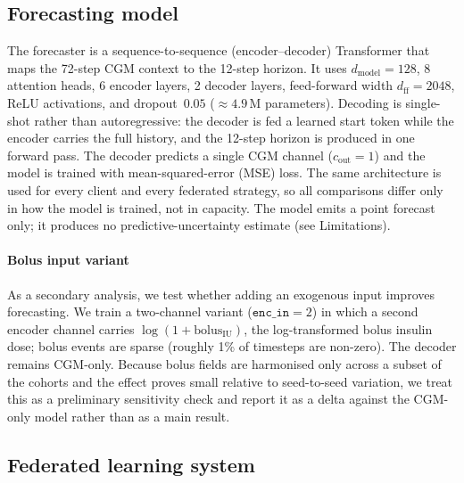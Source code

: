 \documentclass[10pt,letterpaper]{article}
\begin{document}
\subsection*{Forecasting model}

The forecaster is a sequence-to-sequence (encoder--decoder) Transformer that maps
the 72-step CGM context to the 12-step horizon. It uses
$d_{\text{model}}=128$, 8 attention heads, 6 encoder layers, 2 decoder layers,
feed-forward width $d_{\text{ff}}=2048$, ReLU activations, and dropout~$0.05$
($\approx 4.9$\,M parameters). Decoding is single-shot rather than
autoregressive: the decoder is fed a learned start token while the encoder
carries the full history, and the 12-step horizon is produced in one forward
pass. The decoder predicts a single CGM channel ($c_{\text{out}}=1$) and the
model is trained with mean-squared-error (MSE) loss. The same architecture is
used for every client and every federated strategy, so all comparisons differ
only in how the model is trained, not in capacity. The model emits a point
forecast only; it produces no predictive-uncertainty estimate (see Limitations).

\paragraph{Bolus input variant}
As a secondary analysis, we test whether adding an exogenous input improves
forecasting. We train a two-channel variant ($\texttt{enc\_in}=2$) in which a
second encoder channel carries $\log(1+\mathrm{bolus}_{\mathrm{IU}})$, the
log-transformed bolus insulin dose; bolus events are sparse (roughly 1\% of
timesteps are non-zero). The decoder remains CGM-only. Because bolus fields are
harmonised only across a subset of the cohorts and the effect proves small
relative to seed-to-seed variation, we treat this as a preliminary sensitivity
check and report it as a delta against the CGM-only model rather than as a main
result.

\subsection*{Federated learning system}
\end{document}
